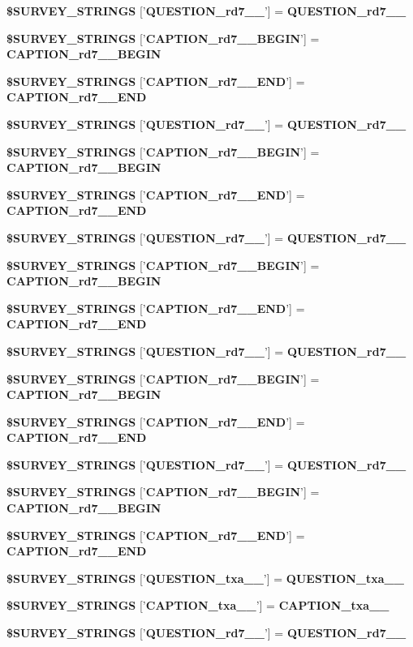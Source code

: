 \begin{CompactItemize}
{\bf \$SURVEY\_\-STRINGS} ['{\bf QUESTION\_\-rd7\_\_\-}'] = {\bf QUESTION\_\-rd7\_\_\-}
\item 
{\bf \$SURVEY\_\-STRINGS} ['{\bf CAPTION\_\-rd7\_\_\-BEGIN}'] = {\bf CAPTION\_\-rd7\_\_\-BEGIN}
\item 
{\bf \$SURVEY\_\-STRINGS} ['{\bf CAPTION\_\-rd7\_\_\-END}'] = {\bf CAPTION\_\-rd7\_\_\-END}
\item 
{\bf \$SURVEY\_\-STRINGS} ['{\bf QUESTION\_\-rd7\_\_\-}'] = {\bf QUESTION\_\-rd7\_\_\-}
\item 
{\bf \$SURVEY\_\-STRINGS} ['{\bf CAPTION\_\-rd7\_\_\-BEGIN}'] = {\bf CAPTION\_\-rd7\_\_\-BEGIN}
\item 
{\bf \$SURVEY\_\-STRINGS} ['{\bf CAPTION\_\-rd7\_\_\-END}'] = {\bf CAPTION\_\-rd7\_\_\-END}
\item 
{\bf \$SURVEY\_\-STRINGS} ['{\bf QUESTION\_\-rd7\_\_\-}'] = {\bf QUESTION\_\-rd7\_\_\-}
\item 
{\bf \$SURVEY\_\-STRINGS} ['{\bf CAPTION\_\-rd7\_\_\-BEGIN}'] = {\bf CAPTION\_\-rd7\_\_\-BEGIN}
\item 
{\bf \$SURVEY\_\-STRINGS} ['{\bf CAPTION\_\-rd7\_\_\-END}'] = {\bf CAPTION\_\-rd7\_\_\-END}
\item 
{\bf \$SURVEY\_\-STRINGS} ['{\bf QUESTION\_\-rd7\_\_\-}'] = {\bf QUESTION\_\-rd7\_\_\-}
\item 
{\bf \$SURVEY\_\-STRINGS} ['{\bf CAPTION\_\-rd7\_\_\-BEGIN}'] = {\bf CAPTION\_\-rd7\_\_\-BEGIN}
\item 
{\bf \$SURVEY\_\-STRINGS} ['{\bf CAPTION\_\-rd7\_\_\-END}'] = {\bf CAPTION\_\-rd7\_\_\-END}
\item 
{\bf \$SURVEY\_\-STRINGS} ['{\bf QUESTION\_\-rd7\_\_\-}'] = {\bf QUESTION\_\-rd7\_\_\-}
\item 
{\bf \$SURVEY\_\-STRINGS} ['{\bf CAPTION\_\-rd7\_\_\-BEGIN}'] = {\bf CAPTION\_\-rd7\_\_\-BEGIN}
\item 
{\bf \$SURVEY\_\-STRINGS} ['{\bf CAPTION\_\-rd7\_\_\-END}'] = {\bf CAPTION\_\-rd7\_\_\-END}
\item 
{\bf \$SURVEY\_\-STRINGS} ['{\bf QUESTION\_\-txa\_\_\-}'] = {\bf QUESTION\_\-txa\_\_\-}
\item 
{\bf \$SURVEY\_\-STRINGS} ['{\bf CAPTION\_\-txa\_\_\-}'] = {\bf CAPTION\_\-txa\_\_\-}
\item 
{\bf \$SURVEY\_\-STRINGS} ['{\bf QUESTION\_\-rd7\_\_\-}'] = {\bf QUESTION\_\-rd7\_\_\-}
\item 

\end{CompactItemize}
